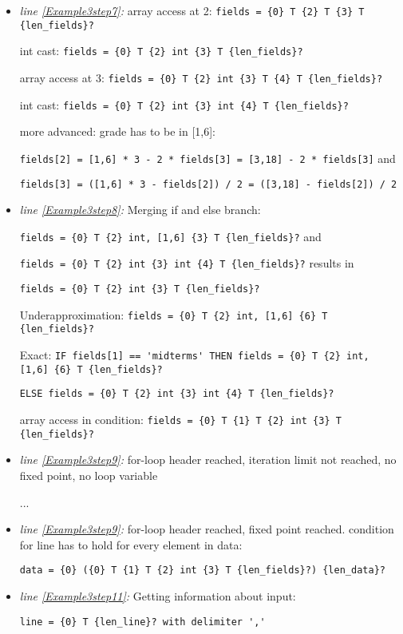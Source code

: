 \documentclass[11pt]{article}
\begin{document}
\begin{itemize}
\item \textit{line \ref{Example3step7}:} array access at 2: \verb|fields = {0} T {2} T {3} T {len_fields}?|

int cast: \verb|fields = {0} T {2} int {3} T {len_fields}?|

array access at 3: \verb|fields = {0} T {2} int {3} T {4} T {len_fields}?|

int cast: \verb|fields = {0} T {2} int {3} int {4} T {len_fields}?|

more advanced: grade has to be in [1,6]: 

\verb|fields[2] = [1,6] * 3 - 2 * fields[3] = [3,18] - 2 * fields[3]| and

\verb|fields[3] = ([1,6] * 3 - fields[2]) / 2 = ([3,18] - fields[2]) / 2|

\item \textit{line \ref{Example3step8}:} Merging if and else branch: 

\verb|fields = {0} T {2} int, [1,6] {3} T {len_fields}?| and 

\verb|fields = {0} T {2} int {3} int {4} T {len_fields}?| results in

\verb|fields = {0} T {2} int {3} T {len_fields}?|

Underapproximation: \verb|fields = {0} T {2} int, [1,6] {6} T {len_fields}?|

Exact: \verb|IF fields[1] == 'midterms' THEN fields = {0} T {2} int, [1,6] {6} T {len_fields}?|

\verb|ELSE fields = {0} T {2} int {3} int {4} T {len_fields}?|

array access in condition: \verb|fields = {0} T {1} T {2} int {3} T {len_fields}?|

\item \textit{line \ref{Example3step9}:} for-loop header reached, iteration limit not reached, no fixed point, no loop variable

...

\item \textit{line \ref{Example3step9}:} for-loop header reached, fixed point reached. condition for line has to hold for every element in data:

\verb|data = {0} ({0} T {1} T {2} int {3} T {len_fields}?) {len_data}?|


\item \textit{line \ref{Example3step11}:} Getting information about input: 

\verb|line = {0} T {len_line}? with delimiter ','|


\end{itemize}
\end{document}
